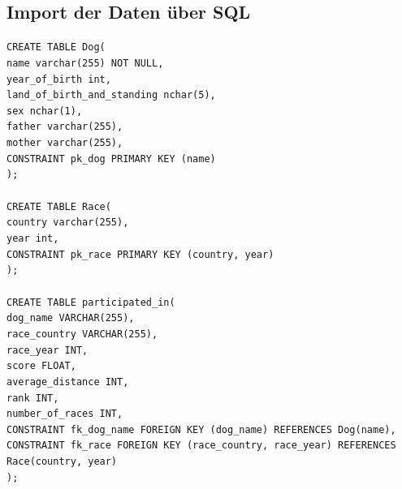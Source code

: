 \documentclass[10pt,a4paper]{article}
\begin{document}
	\subsection{Import der Daten über SQL}
	\texttt{CREATE TABLE Dog(\\
		\hspace*{4mm}	name varchar(255) NOT NULL,	\\
		\hspace*{4mm}	year\_of\_birth int,	\\
		\hspace*{4mm}	land\_of\_birth\_and\_standing nchar(5),	\\
		\hspace*{4mm}	sex nchar(1),	\\
		\hspace*{4mm}	father varchar(255),\\
		\hspace*{4mm}	mother varchar(255),\\
		\hspace*{4mm}	CONSTRAINT pk\_dog PRIMARY KEY (name)\\
		);\\
		\\
		CREATE TABLE Race(\\
		\hspace*{4mm}	country varchar(255),\\
		\hspace*{4mm}	year int,\\
		\hspace*{4mm}	CONSTRAINT pk\_race PRIMARY KEY (country, year)\\
		);\\
		\\
		CREATE TABLE participated\_in(\\
		\hspace*{4mm}	dog\_name VARCHAR(255),\\
		\hspace*{4mm}	race\_country VARCHAR(255),\\
		\hspace*{4mm}	race\_year INT,\\
		\hspace*{4mm}	score FLOAT,\\
		\hspace*{4mm}	average\_distance INT,\\
		\hspace*{4mm}	rank INT,\\
		\hspace*{4mm}	number\_of\_races INT,\\
		\hspace*{4mm}	CONSTRAINT fk\_dog\_name FOREIGN KEY (dog\_name) REFERENCES Dog(name),\\
		\hspace*{4mm}	CONSTRAINT fk\_race FOREIGN KEY (race\_country, race\_year) REFERENCES \\ \hspace*{4mm}	Race(country, year)\\
		); }
\end{document}

